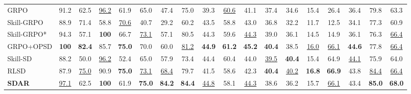 \documentclass{llmxive}
\providecommand{\methodname}{\textsc{SDAR}\xspace}
\begin{document}
\begin{table}[t]
{\begin{tabular}{l CCCCCCC CCCCCCCC CC }
    GRPO
        & 91.2 & 62.5 & \underline{96.2} & 61.9 & 65.0 & 47.4 & 75.0
        & 39.3 & \underline{60.6} & 41.1 & 37.4 & 34.6 & 15.4 & 26.4 & 36.4
        & 79.8 & 63.3
        \\
    Skill-GRPO
        & 88.9 & 71.4 & 58.8 & \underline{70.6} & 40.7 & 29.2 & 60.2
        & 43.5 & 58.8 & 43.0 & 36.8 & 32.2 & 11.7 & 12.5 & 34.1
        & 77.3 & 60.9
        \\
    Skill-GRPO*
        & 94.3 & 57.1 & \textbf{100} & 66.7 & \underline{73.1} & 57.1 & 80.5
        & 44.3 & 59.6 & \underline{44.3} & 39.0 & 36.1 & 14.5 & 14.9 & 36.1
        & 76.3 & \underline{66.4}
        \\
    GRPO+OPSD
        & \textbf{100} & \textbf{82.4} & 85.7 & \textbf{75.0} & 70.0 & 60.0 & \underline{81.2}
        & \textbf{44.9} & \textbf{61.2} & \textbf{45.2} & \textbf{40.4} & 38.5 & \underline{16.0} & \underline{66.1} & \textbf{44.6}
        & 77.8 & \underline{66.4}
        \\
    Skill-SD
        & 88.2 & 50.0 & \underline{96.2} & 52.4 & 65.0 & 57.9 & 73.4
        & 44.4 & 60.4 & 44.0 & \underline{39.5} & \textbf{40.4} & 15.4 & 64.9 & \underline{44.1}
        & 75.9 & 64.0
        \\
    RLSD
        & 87.9 & \underline{75.0} & 90.9 & \textbf{75.0} & \underline{73.1} & \underline{68.4} & 79.7
        & 41.5 & 58.6 & 42.3 & \textbf{40.4} & \underline{40.2} & \textbf{16.8} & \textbf{66.9} & 43.8
        & \underline{84.4} & \underline{66.4}
        \\
    \textbf{\methodname{}}
        & \underline{97.1} & 62.5 & \textbf{100} & 61.9 & \textbf{75.0} & \textbf{84.2} & \textbf{84.4}
        & \underline{44.8} & 58.1 & \underline{44.3} & 38.6 & 36.2 & 15.7 & \underline{66.1} & 43.4
        & \textbf{85.0} & \textbf{68.0}
        \\


\end{tabular}}
\end{table}
\end{document}
